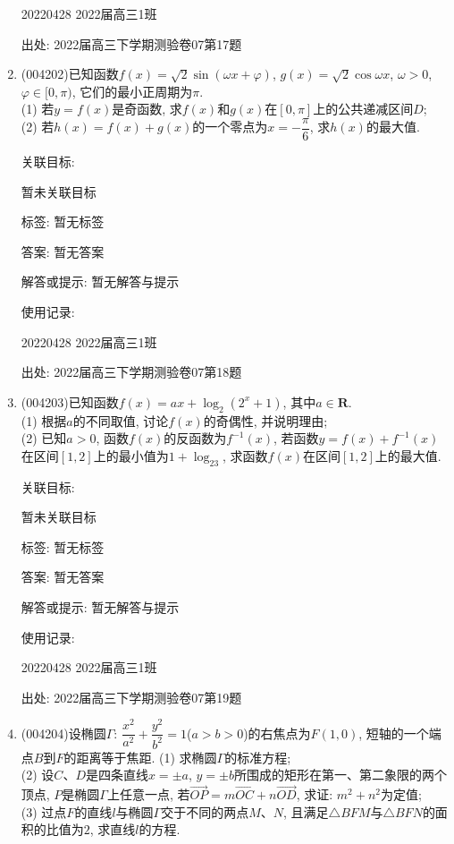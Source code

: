 \documentclass[10pt,a4paper]{article}
\begin{document}
\begin{enumerate}[1.]
20220428	2022届高三1班		


出处: 2022届高三下学期测验卷07第17题
\item { (004202)}已知函数$f(x)=\sqrt 2\sin (\omega x+\varphi)$, $g(x)=\sqrt 2\cos \omega x$, $\omega >0$, $\varphi \in [0,\pi)$, 它们的最小正周期为$\pi$.\\
(1) 若$y=f(x)$是奇函数, 求$f(x)$和$g(x)$在$[0,\pi]$上的公共递减区间$D$;\\
(2) 若$h(x)=f(x)+g(x)$的一个零点为$x=-\dfrac{\pi}6$, 求$h(x)$的最大值.


关联目标:

暂未关联目标



标签: 暂无标签

答案: 暂无答案

解答或提示: 暂无解答与提示

使用记录:

20220428	2022届高三1班		


出处: 2022届高三下学期测验卷07第18题
\item { (004203)}已知函数$f(x)=ax+\log_2(2^x+1)$, 其中$a\in \mathbf{R}$.\\
(1) 根据$a$的不同取值, 讨论$f(x)$的奇偶性, 并说明理由;\\
(2) 已知$a>0$, 函数$f(x)$的反函数为$f^{-1}(x)$, 若函数$y=f(x)+f^{-1}(x)$在区间$[1,2]$上的最小值为$1+\log_23$, 求函数$f(x)$在区间$[1,2]$上的最大值.


关联目标:

暂未关联目标



标签: 暂无标签

答案: 暂无答案

解答或提示: 暂无解答与提示

使用记录:

20220428	2022届高三1班		


出处: 2022届高三下学期测验卷07第19题
\item { (004204)}设椭圆$\Gamma$: $\dfrac{x^2}{a^2}+\dfrac{y^2}{b^2}=1$($a>b>0$)的右焦点为$F(1,0)$, 短轴的一个端点$B$到$F$的距离等于焦距.
(1) 求椭圆$\Gamma$的标准方程;\\
(2) 设$C$、$D$是四条直线$x=\pm a$, $y=\pm b$所围成的矩形在第一、第二象限的两个顶点, $P$是椭圆$\Gamma$上任意一点, 若$\overrightarrow{OP}=m\overrightarrow{OC}+n\overrightarrow{OD}$, 求证: $m^2+n^2$为定值;\\
(3) 过点$F$的直线$l$与椭圆$\Gamma$交于不同的两点$M$、$N$, 且满足$\triangle BFM$与$\triangle BFN$的面积的比值为$2$, 求直线$l$的方程.



\end{enumerate}
\end{document}
